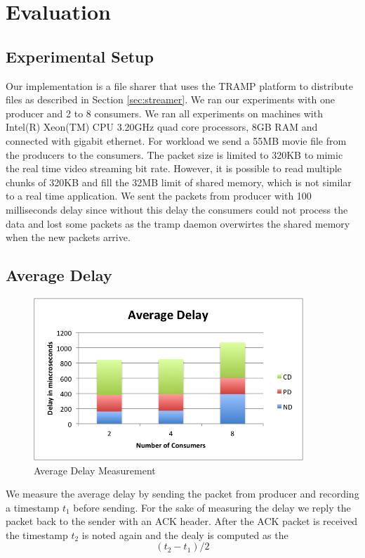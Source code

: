 \section{Evaluation}
\label{sec:eval}

\subsection{Experimental Setup}
Our implementation is a file sharer that uses the TRAMP platform to distribute files as described in Section \ref{sec:streamer}. We ran our experiments with one producer and 2 to 8 consumers. We ran all experiments on machines with Intel(R) Xeon(TM) CPU 3.20GHz quad core processors, 8GB RAM and connected with gigabit ethernet. For workload we send a 55MB movie file from the producers to the consumers. The packet size is limited to 320KB to mimic the real time video streaming bit rate. However, it is possible to read multiple chunks of 320KB and fill the 32MB limit of shared memory, which is not similar to a real time application. We sent the packets from producer with 100 milliseconds delay since without this delay the consumers could not process the data and lost some packets as the tramp daemon overwirtes the shared memory when the new packets arrive.

\subsection{Average Delay}
\begin{center}
\begin{figure}[ht!]
 \centering
 \includegraphics[width=4.0in]{avgdelay.png}
\caption{Average Delay Measurement}
\label{fig:delay}
\end{figure}
\end{center}
We measure the average delay by sending the packet from producer and recording a timestamp $t_1$ before sending. For the sake of measuring the delay we reply the packet back to the sender with an ACK header. After the ACK packet is received the timestamp $t_2$ is noted again and the dealy is computed as the 
\[
 (t_2-t_1)/2
\]


